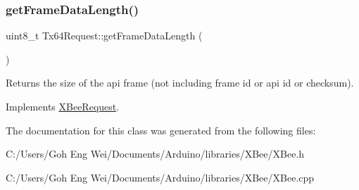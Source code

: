 \subsubsection{\texorpdfstring{get\+Frame\+Data\+Length()}{getFrameDataLength()}}
{\footnotesize\ttfamily uint8\+\_\+t Tx64\+Request\+::get\+Frame\+Data\+Length (\begin{DoxyParamCaption}{ }\end{DoxyParamCaption})\hspace{0.3cm}{\ttfamily [virtual]}}

Returns the size of the api frame (not including frame id or api id or checksum). 

Implements \hyperlink{class_x_bee_request_a03b6c558db5836fa7167c0fba7405642}{X\+Bee\+Request}.



The documentation for this class was generated from the following files\+:\begin{DoxyCompactItemize}
\item 
C\+:/\+Users/\+Goh Eng Wei/\+Documents/\+Arduino/libraries/\+X\+Bee/X\+Bee.\+h\item 
C\+:/\+Users/\+Goh Eng Wei/\+Documents/\+Arduino/libraries/\+X\+Bee/X\+Bee.\+cpp\end{DoxyCompactItemize}

